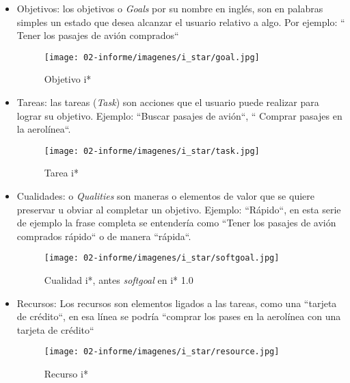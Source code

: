     \begin{itemize}
        \item Objetivos: los objetivos o \textit{Goals} por su nombre en inglés, son en palabras simples un estado que desea alcanzar el usuario relativo a algo. Por ejemplo: `` Tener los pasajes de avión comprados``
        \begin{figure}[h]
            \centering
            \texttt{[image: 02-informe/imagenes/i\_star/goal.jpg]}
            \caption{Objetivo \gls{i*}}
            \label{fig:my_label}
        \end{figure}
        \item Tareas: las tareas (\textit{Task}) son acciones que el usuario puede realizar para lograr su objetivo. Ejemplo: ``Buscar pasajes de avión``, `` Comprar pasajes en la aerolínea``.
                \begin{figure}[h]
            \centering
            \texttt{[image: 02-informe/imagenes/i\_star/task.jpg]}
            \caption{Tarea \gls{i*}}
            \label{fig:my_label}
        \end{figure}
        \item Cualidades: o \textit{Qualities} son maneras o elementos de valor que se quiere preservar u obviar al completar un objetivo. Ejemplo: ``Rápido``, en esta serie de ejemplo la frase completa se entendería como ``Tener los pasajes de avión comprados rápido`` o de manera ``rápida``.
                \begin{figure}[h]
            \centering
            \texttt{[image: 02-informe/imagenes/i\_star/softgoal.jpg]}
            \caption{Cualidad \gls{i*}, antes \textit{softgoal} en i* 1.0}
            \label{fig:my_label}
        \end{figure}
        \item Recursos: Los recursos son elementos ligados a las tareas, como una ``tarjeta de crédito``, en esa línea se podría ``comprar los pases en la aerolínea con una tarjeta de crédito``
                \begin{figure}[h]
            \centering
            \texttt{[image: 02-informe/imagenes/i\_star/resource.jpg]}
            \caption{Recurso \gls{i*}}
            \label{fig:my_label}
        \end{figure}
        

\end{itemize}
